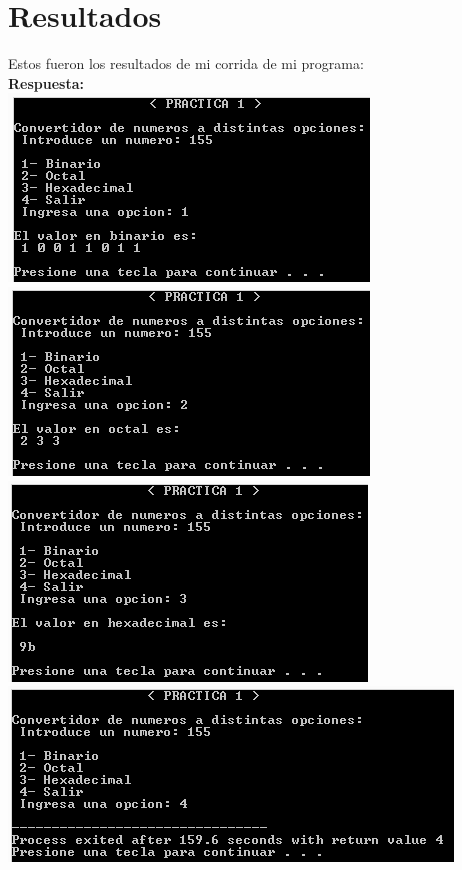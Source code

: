 \documentclass[conference]{IEEEtran}
\begin{document}
\section{Resultados}
	\begin{center}
	Estos fueron los resultados de mi corrida de mi programa: \\
	\textbf{Respuesta: } \\
	\includegraphics{e7} \\
	\includegraphics{e8} \\
	\includegraphics{e9} \\
	\includegraphics{e10} \\
	\end{center}
\end{document}
